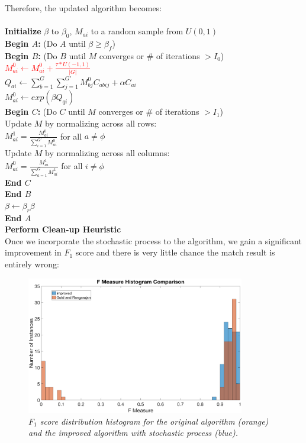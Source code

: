 Therefore, the updated algorithm becomes:\\
\\
\textbf{Initialize} $\beta$ to $\beta_{0}$, $M_{ai}$ to a random sample from $U(0,1)$\\
\textbf{Begin $A$:} (Do $A$ until $\beta \geq \beta_{f}$)\\
\indent \textbf{Begin $B$:} (Do $B$ until $M$ converges or \# of iterations $>I_0$)\\
\indent \textcolor{red}{$M_{ai}^{0} \leftarrow M_{ai}^{0} + \frac{\tau * U(-1,1)}{|G|}$}\\
\indent $Q_{ai} \leftarrow \sum_{b=1}^{G}\sum_{j=1}^{G'}M_{bj}^{0}C_{abij}+\alpha C_{ai}$\\
\indent $M_{ai}^{0} \leftarrow exp(\beta Q_{qi})$\\
\indent \indent \textbf{Begin $C$:} (Do $C$ until $M$ converges or \# of iterations $>I_1$)\\
\indent \indent  Update $M$ by normalizing across all rows:\\
\indent \indent  $M_{ai}^{1}=\frac{M_{ai}^{0}}{\sum_{i=1}^{G'}M_{ai}^{0}}$ for all $a\neq\phi$\\
\indent \indent  Update $M$ by normalizing across all columns:\\
\indent \indent  $M_{ai}^{0}=\frac{M_{ai}^{1}}{\sum_{a=1}^{G}M_{ai}^{1}}$ for all $i\neq\phi$\\
\indent \indent \textbf{End $C$}\\
\indent \textbf{End $B$}\\
$\beta\leftarrow\beta_{r}\beta$\\
\textbf{End $A$}\\
\textbf{Perform Clean-up Heuristic}\\

Once we incorporate the stochastic process to the algorithm, we gain a significant improvement in $F_1$ score and there is very little chance the match result is entirely wrong:

\begin{figure}[h]
	\centering
	\captionsetup{justification=centering}
	\includegraphics[width=0.85\textwidth]{figs/s_improved.png}
	\caption[Caption for LOF]{\emph{$F_1$ score distribution histogram for the original algorithm (orange) and the improved algorithm with stochastic process (blue).}}
	\label{fig:stochastic}
\end{figure}

